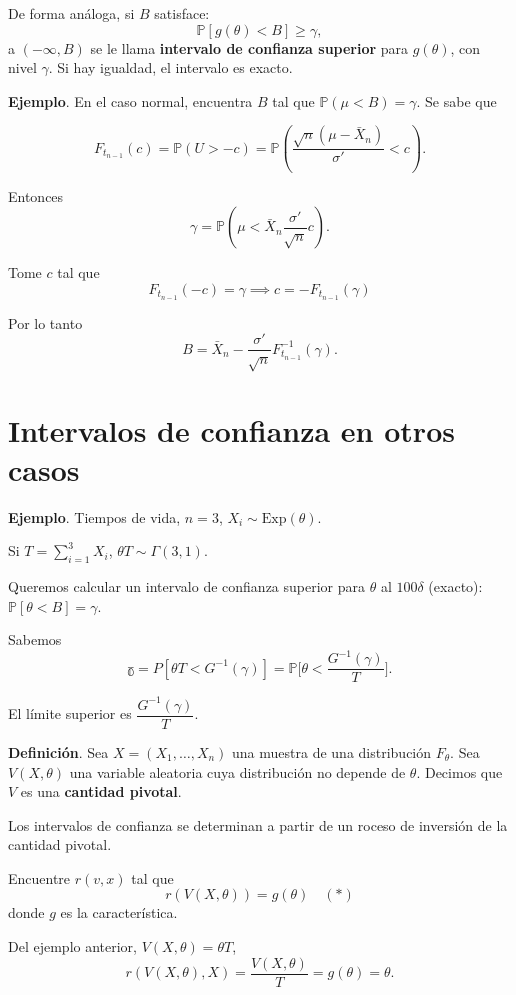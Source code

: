 \documentclass[
  12pt,
]{book}
\begin{document}
De forma análoga, si \(B\) satisface:
\[\mathbb P [g(\theta)<B]\geq \gamma,\]
a \((-\infty,B)\) se le llama \textbf{intervalo de confianza superior} para \(g(\theta)\), con nivel \(\gamma\). Si hay igualdad, el intervalo es exacto.

\textbf{Ejemplo}. En el caso normal, encuentra \(B\) tal que \(\mathbb P(\mu<B) = \gamma\). Se sabe que

\[F_{t_{n-1}}(c) = \mathbb P(U>-c) = \mathbb P \left(\dfrac{\sqrt n(\mu - \bar X_n)}{\sigma'}<c\right).\]

Entonces
\[\gamma = \mathbb P\left(\mu < \bar X_n\dfrac{\sigma'}{\sqrt n}c\right).\]

Tome \(c\) tal que
\[F_{t_{n-1}}(-c) = \gamma \implies c = -F_{t_{n-1}}(\gamma)\]

Por lo tanto
\[B = \bar X_n - \dfrac{\sigma'}{\sqrt{n}}F^{-1}_{t_{n-1}}(\gamma).\]

\hypertarget{intervalos-de-confianza-en-otros-casos}{%
\section{Intervalos de confianza en otros casos}\label{intervalos-de-confianza-en-otros-casos}}

\textbf{Ejemplo}. Tiempos de vida, \(n=3\), \(X_i\sim \text{Exp}(\theta)\).

Si \(T = \sum_{i=1}^3X_i\), \(\theta T\sim \Gamma(3,1)\).

Queremos calcular un intervalo de confianza superior para \(\theta\) al \(100\delta\) (exacto): \(\mathbb P[\theta<B] = \gamma\).

Sabemos
\[\mathbb  \gamma = P[\theta T<G^{-1}(\gamma)] = \mathbb{P}\bigg[\theta<\dfrac{G^{-1}(\gamma)}{T}\bigg].\]

El límite superior es \(\dfrac{G^{-1}(\gamma)}{T}\).

\textbf{Definición}. Sea \(X = (X_1,\dots,X_n)\) una muestra de una distribución \(F_\theta\). Sea \(V(X,\theta)\) una variable aleatoria cuya distribución no depende de \(\theta\). Decimos que \(V\) es una \textbf{cantidad pivotal}.

Los intervalos de confianza se determinan a partir de un roceso de inversión de la cantidad pivotal.

Encuentre \(r(v,x)\) tal que \[r(V(X,\theta)) = g(\theta) \quad (*)\]
donde \(g\) es la característica.

Del ejemplo anterior, \(V(X,\theta) = \theta T\),
\[r(V(X,\theta),X) = \dfrac{V(X,\theta)}T = g(\theta) = \theta.\]
\end{document}
